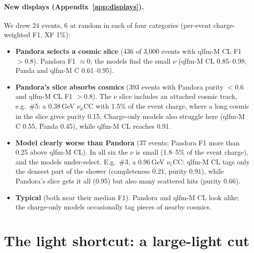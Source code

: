\documentclass[11pt,a4paper]{article}
\newcommand{\nue}{\ensuremath{\nu_e}}
\newcommand{\numu}{\ensuremath{\nu_\mu}}
\begin{document}
\paragraph{New displays (Appendix~\ref{app:displays}).} We drew 24 events, 6 at random in each of four categories (per-event charge-weighted F1, XF 1\%):
\begin{itemize}
  \item \textbf{Pandora selects a cosmic slice} (436 of 3{,}000 events with qlfm-M CL F1 $>0.8$). Pandora F1 $\approx$0; the models find the small $\nu$ (qlfm-M CL 0.85--0.98, Panda and qlfm-M C 0.61--0.95).
  \item \textbf{Pandora's slice absorbs cosmics} (393 events with Pandora purity $<0.6$ and qlfm-M CL F1 $>0.8$). The $\nu$ slice includes an attached cosmic track, e.g.\ \#5: a 0.38\,GeV \numu CC with 1.5\% of the event charge, where a long cosmic in the slice gives purity 0.15. Charge-only models also struggle here (qlfm-M C 0.55, Panda 0.45), while qlfm-M CL reaches 0.91.
  \item \textbf{Model clearly worse than Pandora} (37 events; Pandora F1 more than 0.25 above qlfm-M CL). In all six the $\nu$ is small (1.8--5\% of the event charge), and the models under-select. E.g.\ \#3, a 0.96\,GeV \nue CC: qlfm-M CL tags only the densest part of the shower (completeness 0.21, purity 0.91), while Pandora's slice gets it all (0.95) but also many scattered hits (purity 0.66).
  \item \textbf{Typical} (both near their median F1). Pandora and qlfm-M CL look alike; the charge-only models occasionally tag pieces of nearby cosmics.
\end{itemize}

\section{The light shortcut: a large-light cut}\label{sec:light}
\end{document}

